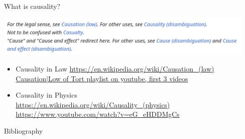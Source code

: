 \documentclass{beamer}
\begin{document}
\begin{frame}{What is causality?}
  \begin{center}
    \includegraphics[width=0.95\textwidth]{Causality-Wikipedia}
  \end{center}
  \begin{itemize}
    \item Causality in Law  \url{https://en.wikipedia.org/wiki/Causation_(law)}
      \href{https://www.youtube.com/watch?v=XiCOmhdkM80&list=PLqMxKp2ot-3vDaLyaAZNgt8ijj6n0l460}{Causation|Low of Tort playlist on youtube, first 3 videos}  
    \item Causality in Physics \\
       \url{https://en.wikipedia.org/wiki/Causality_(physics)}  \\
       \url{https://www.youtube.com/watch?v=eG_eHDDMgCs} \\
       \cite{rovelli2022causationrootedthermodynamics}  
                             
  \end{itemize}
\end{frame}
\begin{frame}[allowframebreaks]{Bibliography}

\end{frame}
\end{document}
